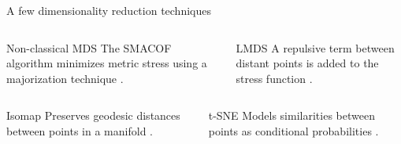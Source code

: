 \documentclass[10pt]{beamer}
\begin{document}
\begin{frame}{A few dimensionality reduction techniques}
    
    \begin{columns}[T]
        \begin{column}{0.48\textwidth}
            \begin{alertblock}{Non-classical MDS}
                The SMACOF algorithm minimizes metric stress using a majorization technique \citep{Kruskal1964a,Kruskal1964b}.
                \vfill
            \end{alertblock}
        \end{column}
        \begin{column}{0.48\textwidth}
            \begin{alertblock}{LMDS}
                A repulsive term between distant points is added to the stress function \citep{Chen2009}.
                \vfill
            \end{alertblock}
        \end{column}
    \end{columns}
    
    \vspace{0.5cm}
    
    \begin{columns}[T]
        \begin{column}{0.48\textwidth}
            \begin{alertblock}{Isomap}
                Preserves geodesic distances between points in a manifold \citep{Tenenbaum2000}.
                \vfill
            \end{alertblock}
        \end{column}
        \begin{column}{0.48\textwidth}
            \begin{alertblock}{t-SNE}
                Models similarities between points as conditional probabilities \citep{Vandermaaten2008}.
                \vfill
            \end{alertblock}
        \end{column}
    \end{columns}
\end{frame}
\end{document}

